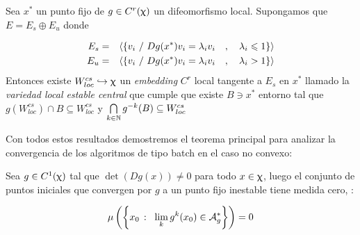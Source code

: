 
\begin{theorem}
	\label{teo: variedad local estable central}
	Sea $x^*$ un punto fijo de $g \in C^{r}(\upchi)$ un difeomorfismo local. Supongamos que $E = E_s \oplus E_u$ donde 
	
	\begin{equation*}
	\begin{aligned}
	E_s & = & \langle \left\lbrace v_i \ / \ Dg(x^*)v_i = \lambda_i v_i \quad , \quad \lambda_i \leqslant 1\right\rbrace \rangle \\
	E_u & = & \langle \left\lbrace v_i \ / \ Dg(x^*)v_i = \lambda_i v_i \quad , \quad \lambda_i > 1\right\rbrace \rangle \\
	\end{aligned}
	\end{equation*}
	Entonces existe $W_{loc}^{cs} \hookrightarrow \upchi$ un \textit{embedding} $C^r$ local tangente a $E_s$ en $x^*$ llamado la \textit{variedad local estable central} que cumple que existe $B \ni x^*$ entorno tal que $g\left(W_{loc}^{cs}\right) \cap B \subseteq W_{loc}^{cs}$ y $\bigcap\limits_{k \in {\mathbb{N}}}{g^{-k}(B)} \subseteq W_{loc}^{cs}$
\end{theorem}

Con todos estos resultados demostremos el teorema principal para analizar la convergencia de los algoritmos de tipo batch en el caso no convexo:

\begin{theorem}
	\label{teo: Principal}
	Sea $g \in C^1(\upchi)$ tal que $\det\left(Dg(x)\right) \neq 0$ para todo $x \in \upchi$, luego el conjunto de puntos iniciales que convergen por $g$ a un punto fijo inestable tiene medida cero, \ie:
	
	\begin{equation*}
	\mu \left(\sett{x_0 \ \colon \ \Biglim{k}{g^k(x_0) \in \mathcal{A}_g^{*}}}\right) = 0
	\end{equation*}
\end{theorem}

